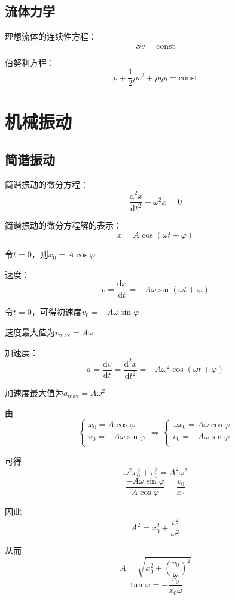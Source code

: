 \documentclass[12pt, a4paper, twoside]{ctexbook}
\begin{document}
\section{流体力学}
{\sonti 理想流体的连续性方程}：
$$
Sv=\mathrm{const}
$$

{\sonti 伯努利方程}：
$$
p+\frac{1}{2}\rho v^2+\rho gy=\mathrm{const}
$$
\chapter{机械振动}
\newpage
\section{简谐振动}
{\sonti 简谐振动的微分方程}：
$$
\frac{\mathrm{d}^2x}{\mathrm{d}t^2}+\omega^2 x=0
$$

{\sonti 简谐振动的微分方程解的表示}：
$$
x=A\cos\left(\omega t+\varphi\right)
$$

令$t=0$，则$x_0=A\cos\varphi$

{\sonti 速度}：
$$
v=\frac{\mathrm{d}x}{\mathrm{d}t}=-A\omega\sin\left(\omega t+\varphi\right)
$$

令$t=0$，可得初速度$v_0=-A\omega\sin\varphi$

速度最大值为$v_\mathrm{max}=A\omega$

{\sonti 加速度}：
$$
a=\frac{\mathrm{d}v}{\mathrm{d}t}=\frac{\mathrm{d}^2x}{\mathrm{d}t^2}=-A\omega^2\cos\left(\omega t+\varphi\right)
$$

加速度最大值为$a_\mathrm{max}=A\omega^2$

由
$$
\left\{ \begin{array}{l}
	x_0=A\cos \varphi\\
	v_0=-A\omega \sin \varphi\\
\end{array} \right. \Rightarrow \left\{ \begin{array}{l}
	\omega x_0=A\omega \cos \varphi\\
	v_0=-A\omega \sin \varphi\\
\end{array} \right. 
$$

可得
$$
\omega^2x_0^2+v_0^2=A^2\omega^2
$$
$$
\frac{-A\omega\sin\varphi}{A\cos\varphi}=\frac{v_0}{x_0}
$$

因此
$$
A^2=x_0^2+\frac{v_0^2}{\omega^2}
$$

从而
$$
A=\sqrt{x_0^2+\left(\frac{v_0}{\omega}\right)^2}
$$
$$
\tan\varphi=-\frac{v_0}{x_0\omega}
$$
\end{document}

